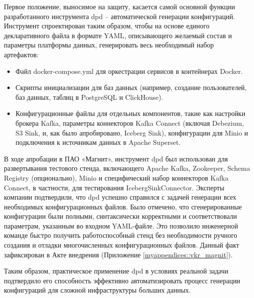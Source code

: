Первое положение, выносимое на защиту, касается самой основной функции разработанного инструмента dpd – автоматической генерации конфигураций. Инструмент спроектирован таким образом, чтобы на основе единого декларативного файла в формате YAML, описывающего желаемый состав и параметры платформы данных, генерировать весь необходимый набор артефактов:
\begin{itemize}
    \item Файл docker-compose.yml для оркестрации сервисов в контейнерах Docker.
    \item Скрипты инициализации для баз данных (например, создание пользователей, баз данных, таблиц в PostgreSQL и ClickHouse).
    \item Конфигурационные файлы для отдельных компонентов, такие как настройки брокера Kafka, параметры коннекторов Kafka Connect (включая Debezium, S3 Sink, и, как было апробировано, Iceberg Sink), конфигурации для Minio и подключения к источникам данных в Apache Superset.
\end{itemize}
В ходе апробации в ПАО «Магнит», инструмент dpd был использован для развертывания тестового стенда, включающего Apache Kafka, Zookeeper, Schema Registry (опционально), Minio и специфический набор коннекторов Kafka Connect, в частности, для тестирования IcebergSinkConnector. Эксперты компании подтвердили, что dpd успешно справился с задачей генерации всех необходимых конфигурационных файлов. Было отмечено, что сгенерированные конфигурации были полными, синтаксически корректными и соответствовали параметрам, указанным во входном YAML-файле. Это позволило инженерной команде быстро получить работоспособный стенд без необходимости ручного создания и отладки многочисленных конфигурационных файлов. Данный факт зафиксирован в Акте внедрения (Приложение \ref{myappendices::vkr_magnit}).

Таким образом, практическое применение dpd в условиях реальной задачи подтвердило его способность эффективно автоматизировать процесс генерации конфигураций для сложной инфраструктуры больших данных.


